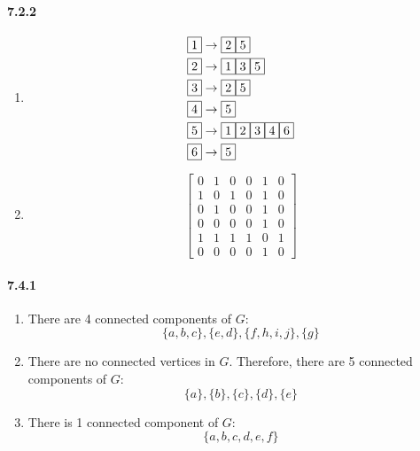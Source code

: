 \documentclass[11pt, letterpaper, twocolumn, fleqn]{article}
\begin{document}
\paragraph{7.2.2}
\begin{enumerate}
  \item 
  \begin{align*}
    &\fbox{1} \rightarrow \fbox{2}\fbox{5} \\
    &\fbox{2} \rightarrow \fbox{1}\fbox{3}\fbox{5}\\
    &\fbox{3} \rightarrow \fbox{2}\fbox{5}\\
    &\fbox{4} \rightarrow \fbox{5}\\
    &\fbox{5} \rightarrow \fbox{1}\fbox{2}\fbox{3}\fbox{4}\fbox{6}\\
    &\fbox{6} \rightarrow \fbox{5}
  \end{align*}
  \item 
  $$\begin{bmatrix}
    0 & 1 & 0 & 0 & 1 & 0 \\
    1 & 0 & 1 & 0 & 1 & 0 \\
    0 & 1 & 0 & 0 & 1 & 0 \\
    0 & 0 & 0 & 0 & 1 & 0 \\
    1 & 1 & 1 & 1 & 0 & 1 \\
    0 & 0 & 0 & 0 & 1 & 0
  \end{bmatrix}$$
\end{enumerate}

\paragraph{7.4.1}
\begin{enumerate}
  \item There are 4 connected components of $G$:
    $$\{a,b,c\},\{e,d\},\{f,h,i,j\},\{g\}$$
    
  \item There are no connected vertices in $G$. Therefore, there are 5 connected components of $G$:
    $$\{a\},\{b\},\{c\},\{d\},\{e\}$$
    
  \item There is 1 connected component of $G$:
    $$\{a,b,c,d,e,f\}$$
    
\end{enumerate}
\end{document}

